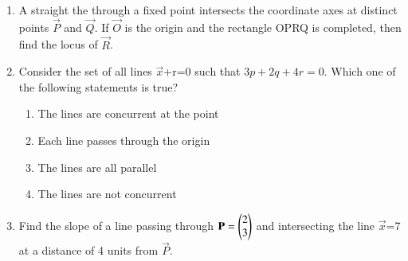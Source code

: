 \begin{enumerate}[label=\arabic*.,ref=\thesubsection.\theenumi]
\begin{enumerate}
     \end{enumerate}
    \item A straight the through a fixed point  intersects the coordinate axes at distinct points $\vec{P}$ and $\vec{Q}$. If $\vec{O}$ is the origin and the rectangle OPRQ is completed, then find the locus of $\vec{R}$.
    \item Consider the set of all lines  $\vec {x}$+r=0 such that $3p+2q+4r=0$. Which one of the following statements is true?
    \begin{enumerate}
     \item  The lines are concurrent at the point 
     \item  Each line passes through the origin
     \item  The lines are all parallel
     \item  The lines are not concurrent
     \end{enumerate}
    \item Find the slope of a line passing through $\mathbf{P} = \begin{pmatrix}2\\3\end{pmatrix}$ and intersecting the line 
    $\vec {x}$=7 at a distance of 4 units from $\vec{P}$.
\end{enumerate}

%
